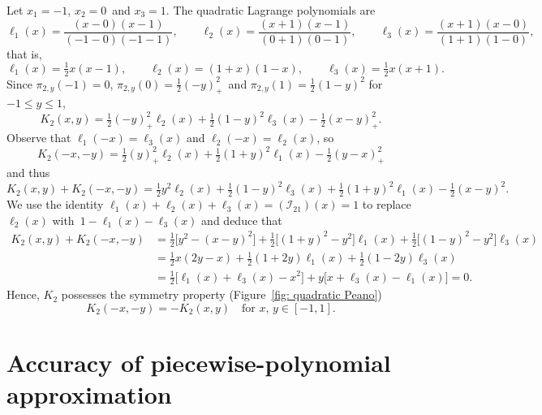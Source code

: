 \begin{example}\label{example: quadratic interp}
Let $x_1=-1$, $x_2=0$~and $x_3=1$.  The quadratic Lagrange polynomials are
\[
\ell_1(x)=\frac{(x-0)(x-1)}{(-1-0)(-1-1)},\qquad
\ell_2(x)=\frac{(x+1)(x-1)}{(0+1)(0-1)},\qquad
\ell_3(x)=\frac{(x+1)(x-0)}{(1+1)(1-0)},
\]
that is,
\[
\ell_1(x)=\tfrac12x(x-1),\qquad
\ell_2(x)=(1+x)(1-x),\qquad
\ell_3(x)=\tfrac12x(x+1).
\]
Since $\pi_{2,y}(-1)=0$, $\pi_{2,y}(0)=\tfrac12(-y)_+^2$~and 
$\pi_{2,y}(1)=\tfrac12(1-y)^2$ for~$-1\le y\le 1$,
\begin{equation}\label{eq: quadratic Peano}
K_2(x,y)=\tfrac12(-y)_+^2\ell_2(x)+\tfrac12(1-y)^2\ell_3(x)-\tfrac12(x-y)_+^2.
\end{equation}
Observe that $\ell_1(-x)=\ell_3(x)$ and $\ell_2(-x)=\ell_2(x)$, so
\[
K_2(-x,-y)=\tfrac12(y)_+^2\ell_2(x)+\tfrac12(1+y)^2\ell_1(x)-\tfrac12(y-x)_+^2
\]
and thus
\[
K_2(x,y)+K_2(-x,-y)=\tfrac12y^2\ell_2(x)+\tfrac12(1-y)^2\ell_3(x)
	+\tfrac12(1+y)^2\ell_1(x)-\tfrac12(x-y)^2.
\]
We use the identity $\ell_1(x)+\ell_2(x)+\ell_3(x)=(\mathcal{I}_21)(x)=1$ to
replace $\ell_2(x)$ with~$1-\ell_1(x)-\ell_3(x)$ and deduce that
\begin{align*}
K_2(x,y)+K_2(-x,-y)&=\tfrac12\bigl[y^2-(x-y)^2\bigr]
	+\tfrac12\bigl[(1+y)^2-y^2\bigr]\ell_1(x)
	+\tfrac12\bigl[(1-y)^2-y^2\bigr]\ell_3(x)\\
	&=\tfrac12x(2y-x)+\tfrac12(1+2y)\ell_1(x)+\tfrac12(1-2y)\ell_3(x)\\
	&=\tfrac12\bigl[\ell_1(x)+\ell_3(x)-x^2\bigr]
	+y\bigl[x+\ell_3(x)-\ell_1(x)\bigr]=0.
\end{align*}
Hence, $K_2$ possesses the symmetry property (Figure~\ref{fig: quadratic Peano})
\begin{equation}\label{eq: K2 symmetry}
K_2(-x,-y)=-K_2(x,y)\quad\text{for $x$, $y\in[-1,1]$.}
\end{equation}
\end{example}


\section{Accuracy of piecewise-polynomial approximation}
\label{sec: accuracy of interpolation}

